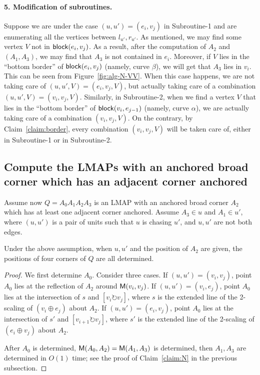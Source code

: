 \documentclass{ws-ijcga}
\begin{document}
\paragraph{5. Modification of subroutines.}
Suppose we are under the case $(u,u')=(e_i,v_j)$ in Subroutine-1 and are enumerating all the vertices between $l_{u'},r_{u'}$.
As mentioned, we may find some vertex $V$ not in $\mathsf{block}(e_i,v_j)$.
As a result, after the computation of $A_2$ and $(A_1,A_3)$, we may find that $A_3$ is not contained in $e_i$.
Moreover, if $V$ lies in the ``bottom border'' of $\mathsf{block}(e_i,v_j)$ (namely, curve $\beta$), we will get that $A_3$ lies in $v_i$.
This can be seen from Figure~\ref{fig:alg-N-VV}.
When this case happens, we are not taking care of $(u,u',V)=(e_i,v_j,V)$, but actually taking care of a combination $(u,u',V)=(v_i,v_j,V)$.
Similarly, in Subroutine-2, when we find a vertex $V$ that lies in the ``bottom border'' of $\mathsf{block}(v_i,e_{j-1})$ (namely, curve $\alpha$),
  we are actually taking care of a combination $(v_i,v_j,V)$.
On the contrary, by Claim~\ref{claim:border}, every combination $(v_i,v_j,V)$ will be taken care of, either in Subroutine-1 or in Subroutine-2.

\subsection{Compute the LMAPs with an anchored broad corner which has an adjacent corner anchored}

Assume now $Q=A_0A_1A_2A_3$ is an LMAP with an anchored broad corner $A_2$ which has at least one adjacent corner anchored.
Assume $A_3\in u$ and $A_1\in u'$, where $(u,u')$ is a pair of units such that $u$ is chasing $u'$, and $u,u'$ are not both edges.

\begin{claim}\label{claim:B}
Under the above assumption, when $u,u'$ and the position of $A_2$ are given, the positions of four corners of $Q$ are all determined.
\end{claim}

\begin{proof}
We first determine $A_0$. Consider three cases.
If $(u,u')=(v_i,v_j)$, point $A_0$ lies at the reflection of $A_2$ around $\mathsf{M}(v_i,v_j)$.
If $(u,u')=(v_i,e_j)$, point $A_0$ lies at the intersection of $s$ and $[v_i\circlearrowright v_j]$,
  where $s$ is the extended line of the 2-scaling of $(v_i\oplus e_j)$ about $A_2$.
If $(u,u')=(e_i,v_j)$, point $A_0$ lies at the intersection of $s'$ and $[v_{i+1}\circlearrowright v_j]$,
  where $s'$ is the extended line of the 2-scaling of $(e_i\oplus v_j)$ about $A_2$.

After $A_0$ is determined, $\mathsf{M}(A_0,A_2)=\mathsf{M}(A_1,A_3)$ is determined, then $A_1,A_3$ are determined in $O(1)$ time;
  see the proof of Claim~\ref{claim:N} in the previous subsection.
 \end{proof}
\end{document}
